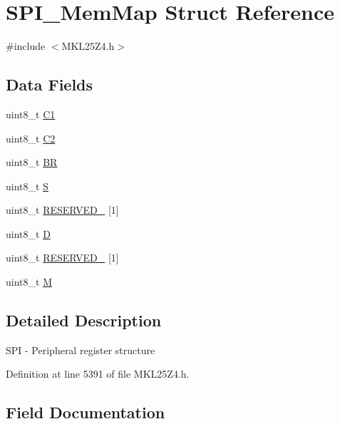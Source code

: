 \hypertarget{struct_s_p_i___mem_map}{}\section{S\+P\+I\+\_\+\+Mem\+Map Struct Reference}
\label{struct_s_p_i___mem_map}


{\ttfamily \#include $<$M\+K\+L25\+Z4.\+h$>$}

\subsection*{Data Fields}
\begin{DoxyCompactItemize}
\item 
uint8\+\_\+t \hyperlink{struct_s_p_i___mem_map_ab9f017bddfa72e299d9c0ab7ab400c1b}{C1}
\item 
uint8\+\_\+t \hyperlink{struct_s_p_i___mem_map_aae7ca381054324cf98aac30ce607046a}{C2}
\item 
uint8\+\_\+t \hyperlink{struct_s_p_i___mem_map_ad2c201cf5aa72904503df243610507b8}{BR}
\item 
uint8\+\_\+t \hyperlink{struct_s_p_i___mem_map_ad905fa29c8b2f0ca5b93222e7961542b}{S}
\item 
uint8\+\_\+t \hyperlink{struct_s_p_i___mem_map_a389ec0465af8c44c5e4f4faaad940f8c}{R\+E\+S\+E\+R\+V\+E\+D\+\_} \mbox{[}1\mbox{]}
\item 
uint8\+\_\+t \hyperlink{struct_s_p_i___mem_map_aa940ca36df1b702c6c03557f442cde16}{D}
\item 
uint8\+\_\+t \hyperlink{struct_s_p_i___mem_map_ad5fafb348f6501bbb48ed41bd58f4aab}{R\+E\+S\+E\+R\+V\+E\+D\+\_} \mbox{[}1\mbox{]}
\item 
uint8\+\_\+t \hyperlink{struct_s_p_i___mem_map_acd26c314a794ed500a27a4b6bc51eec9}{M}
\end{DoxyCompactItemize}


\subsection{Detailed Description}
S\+PI -\/ Peripheral register structure 

Definition at line 5391 of file M\+K\+L25\+Z4.\+h.



\subsection{Field Documentation}
